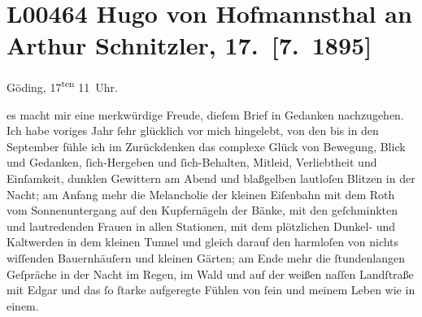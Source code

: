 

\section[Hugo von Hofmannsthal an Arthur Schnitzler, 17. {[}7. 1895{]}]{L00464 Hugo von Hofmannsthal an Arthur Schnitzler, 17. {[}7. 1895{]}}
\nopagebreak{}
\rehead{ }\normalsize\beginnumbering{}
\toendnotes[C]{\smallbreak\pagebreak[2]}
\toendnotes[C]{\smallbreak}
\pstart
           \raggedleft{}{\pb}Göding, 17\textsuperscript{ten}{ }11 Uhr. \pend
           
\pstart
           \raggedleft{}\textcolor{gray}{\textbf{}}\pend
           \vspace{0.5em}
\pstart
           es macht mir eine merkwürdige Freude, dieſem Brief in Gedanken nachzugehen. Ich habe
               voriges Jahr ſehr glücklich vor mich hingelebt, von den \label{K_L00464-1v}\label{K_L00464-1} bis in den September
               fühle ich im Zurückdenken das complexe Glück von Bewegung, Blick und Gedanken,
               ſich-Hergeben und ſich-Behalten, Mitleid, Verliebtheit und Einſamkeit, dunklen
               Gewittern am Abend und blaßgelben lautloſen Blitzen in der Nacht; am Anfang mehr die
               Melancholie der kleinen Eiſenbahn mit dem Roth vom Sonnenuntergang auf den
               Kupfernägeln der Bänke, mit den geſchminkten und lautredenden {\pb}Frauen in allen Stationen, mit dem
               plötzlichen Dunkel- und Kaltwerden in dem kleinen Tunnel und gleich darauf den
               harmloſen von nichts wiſſenden Bauernhäuſern und kleinen Gärten; am Ende mehr die
               ſtundenlangen Geſpräche in der Nacht im Regen, im Wald und auf der weißen naſſen
               Landſtraße mit Edgar und das ſo ſtarke
               aufgeregte Fühlen von ſein und meinem Leben wie in einem.\pend
           
